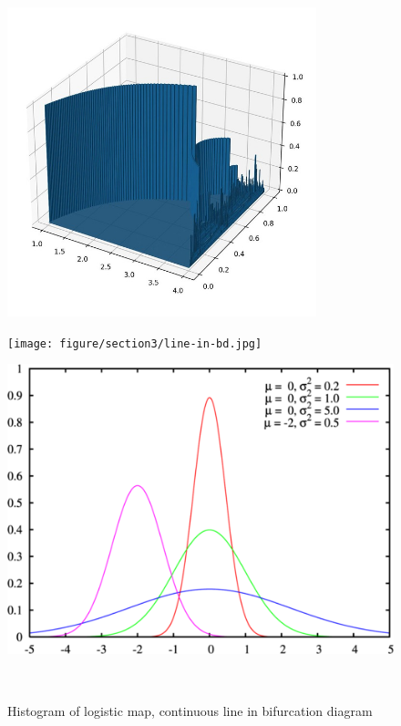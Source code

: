 \documentclass[12pt]{article}
\theoremstyle{plain}
\begin{document}
\begin{figure}[H]
\begin{minipage}[c][0.30\width]{
   0.30\textwidth}
   \centering
   \includegraphics[width=0.8\textwidth]{figure/section3/Histogram-logistic.jpg}
\end{minipage}
\begin{minipage}[c][0.30\width]{
   0.30\textwidth}
   \centering
   \texttt{[image: figure/section3/line-in-bd.jpg]}
\end{minipage}
\begin{minipage}[c][0.30\width]{
   0.30\textwidth}
   \centering
   \includegraphics[width=1\textwidth]{figure/section3/GMM.png}
\end{minipage}
\\[3ex]\caption{Histogram of logistic map, continuous line in bifurcation diagram}\label{Histogram-logistic-map}
\end{figure}
\end{document}
